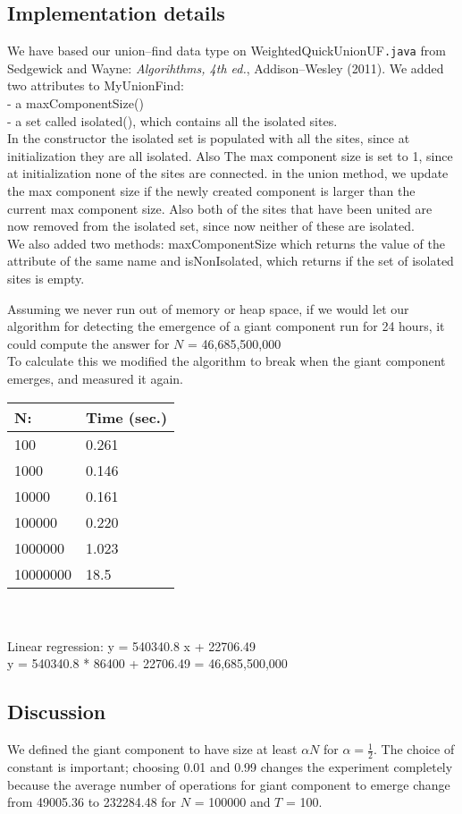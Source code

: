\documentclass{tufte-handout}
\begin{document}
\subsection{Implementation details}

We have based our union--find data type on {WeightedQuickUnionUF\tt .java} from Sedgewick and Wayne: {\em Algorihthms, 4th ed.}, Addison--Wesley (2011). We added two attributes to MyUnionFind: \\
- a maxComponentSize() \\
- a set called isolated(), which contains all the isolated sites. \\
In the constructor the isolated set is populated with all the sites, since at initialization they are all isolated. Also The max component size is set to 1, since at initialization none of the sites are connected.
in the union method, we update the max component size if the newly created component is larger than the current max component size.
Also both of the sites that have been united are now removed from the isolated set, since now neither of these are isolated. \\
We also added two methods: maxComponentSize which returns the value of the attribute of the same name and isNonIsolated, which returns if the set of isolated sites is empty.

Assuming we never run out of memory or heap space, if we would let our algorithm for detecting the emergence of a giant component run for 24 hours, it could compute the answer for $N$ = 46,685,500,000 \\

To calculate this we modified the algorithm to break when the giant component emerges, and measured it again. \\

\begin{tabular}{ll}
  \toprule
  N: & Time (sec.) \\
  \midrule
  100 & 0.261 \\
  1000 & 0.146 \\
  10000 & 0.161 \\
  100000 & 0.220 \\
  1000000 & 1.023 \\
  10000000 & 18.5 \\
  \bottomrule
\end{tabular}\\ \\

Linear regression: y = 540340.8 x + 22706.49 \\

		y = 540340.8 * 86400 + 22706.49 = 46,685,500,000

\subsection{Discussion}

We defined the giant component to have size at least $\alpha N$ for $\alpha = \frac{1}{2}$. The choice of constant is important; choosing 0.01 and 0.99 changes the experiment completely because
the average number of operations for giant component to emerge change from 49005.36 to 232284.48 for  $N$ = 100000 and  $T$ = 100. 
\end{document}
